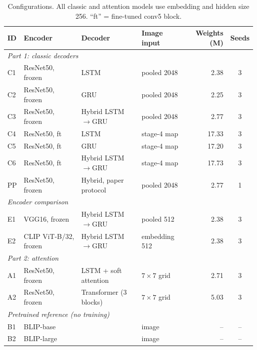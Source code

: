 \documentclass[11pt]{article}
\newcommand{\tbl}[2]{\caption{#1}{\sffamily\small #2}}
\newcommand{\tabnote}[1]{\par\vspace{3pt}{\noindent\sffamily\footnotesize\raggedright #1\par}}
\begin{document}
\begin{table}[tbp]\centering
\tbl{Configurations. All classic and attention models use embedding and hidden size 256. ``ft'' = fine-tuned conv5 block.}
{\begin{tabular}{llllrc}\toprule
ID & Encoder & Decoder & Image input & Weights (M) & Seeds\\\midrule
\multicolumn{6}{l}{\textit{Part 1: classic decoders}}\\
C1 & ResNet50, frozen & LSTM & pooled 2048 & 2.38 & 3\\
C2 & ResNet50, frozen & GRU & pooled 2048 & 2.25 & 3\\
C3 & ResNet50, frozen & Hybrid LSTM$\rightarrow$GRU & pooled 2048 & 2.77 & 3\\
C4 & ResNet50, ft & LSTM & stage-4 map & 17.33 & 3\\
C5 & ResNet50, ft & GRU & stage-4 map & 17.20 & 3\\
C6 & ResNet50, ft & Hybrid LSTM$\rightarrow$GRU & stage-4 map & 17.73 & 3\\
PP & ResNet50, frozen & Hybrid, paper protocol & pooled 2048 & 2.77 & 1\\\midrule
\multicolumn{6}{l}{\textit{Encoder comparison}}\\
E1 & VGG16, frozen & Hybrid LSTM$\rightarrow$GRU & pooled 512 & 2.38 & 3\\
E2 & CLIP ViT-B/32, frozen & Hybrid LSTM$\rightarrow$GRU & embedding 512 & 2.38 & 3\\\midrule
\multicolumn{6}{l}{\textit{Part 2: attention}}\\
A1 & ResNet50, frozen & LSTM + soft attention & $7{\times}7$ grid & 2.71 & 3\\
A2 & ResNet50, frozen & Transformer (3 blocks) & $7{\times}7$ grid & 5.03 & 3\\\midrule
\multicolumn{6}{l}{\textit{Pretrained reference (no training)}}\\
B1 & \multicolumn{2}{l}{BLIP-base \cite{li2022blip}} & image & -- & --\\
B2 & \multicolumn{2}{l}{BLIP-large \cite{li2022blip}} & image & -- & --\\\bottomrule
\end{tabular}}
\tabnote{Weights are trainable parameters. For C4--C6 they include the 15 M weights of the conv5 block.}
\label{tab:configs}
\end{table}
\end{document}
